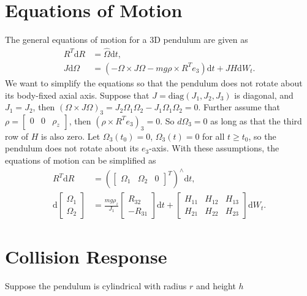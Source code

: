 \documentclass[10pt]{article}
\newcommand{\diff}[1]{\mathrm{d}#1}
\newcommand{\diag}{\ensuremath{\mathrm{diag}}}
\begin{document}
\section{Equations of Motion}

The general equations of motion for a 3D pendulum are given as
\begin{align}
	R^T\diff{R} &= \hat{\Omega}\diff{t}, \\
	J\diff{\Omega} &= \left( -\Omega\times J\Omega - mg\rho\times R^Te_3 \right) \diff{t} + JH\diff{W}_t.
\end{align}
We want to simplify the equations so that the pendulum does not rotate about its body-fixed axial axis.
Suppose that $J = \diag(J_1,J_2,J_3)$ is diagonal, and $J_1 = J_2$, then $(\Omega\times J\Omega)_3 = J_2\Omega_1\Omega_2 - J_1\Omega_1\Omega_2 = 0$.
Further assume that $\rho = \begin{bmatrix} 0 & 0 & \rho_z \end{bmatrix}$, then $(\rho\times R^Te_3)_3 = 0$.
So $d\Omega_3 = 0$ as long as that the third row of $H$ is also zero.
Let $\Omega_3(t_0) = 0$, $\Omega_3(t)=0$ for all $t\geq t_0$, so the pendulum does not rotate about its $e_3$-axis.
With these assumptions, the equations of motion can be simplified as
\begin{align}
	R^T\diff{R} &= \left( \begin{bmatrix} \Omega_1 & \Omega_2 & 0 \end{bmatrix}^T \right)^\wedge \diff{t}, \\
	\diff{\begin{bmatrix} \Omega_1 \\ \Omega_2 \end{bmatrix}} &= \frac{mg\rho_z}{J_1} \begin{bmatrix} R_{32} \\ -R_{31} \end{bmatrix} \diff{t} + \begin{bmatrix} H_{11} & H_{12} & H_{13} \\ H_{21} & H_{22} & H_{23} \end{bmatrix} \diff{W_t}.
\end{align}

\section{Collision Response}

Suppose the pendulum is cylindrical with radius $r$ and height $h$
\end{document}

